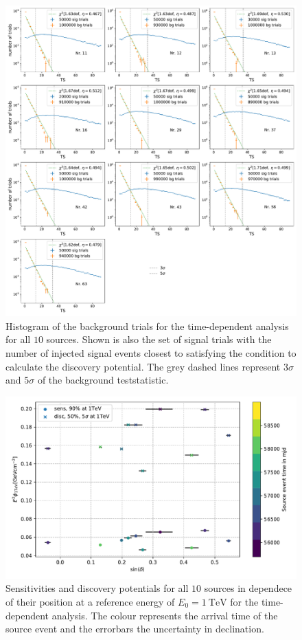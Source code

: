 \begin{figure}
    \centering
    \includegraphics[width=\linewidth]{Plots/appendix/9_years_gfu_gold_time_dep_sig_disc_ts.pdf}
    \caption{Histogram of the background trials for the time-dependent analysis for all $\num{10}$ sources. Shown is also the set of signal trials with the number of injected signal events closest to satisfying the condition to calculate the discovery potential. The grey dashed lines represent $\num{3}\sigma$ and $\num{5}\sigma$ of the background teststatistic.}
    \label{fig:time_dep_sig_disc_ts}
\end{figure}

\begin{figure}
    \centering
    \includegraphics[width=\linewidth]{Plots/appendix/time_dep_sens_disc_dec_time_2.pdf}
    \caption{Sensitivities and discovery potentials for all $\num{10}$ sources in dependece of their position at a reference energy of $E_0 = \SI{1}{\tera\electronvolt}$ for the time-dependent analysis. The colour represents the arrival time of the source event and the errorbars the uncertainty in declination.}
    \label{fig:sens_disc_time_dep_dec}
\end{figure}

